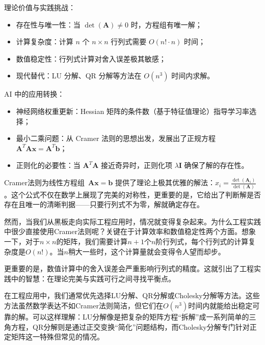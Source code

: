 理论价值与实践挑战：
\begin{itemize}
  \item 存在性与唯一性：当 $\det(\mathbf{A}) \neq 0$ 时，方程组有唯一解；
  \item 计算复杂度：计算 $n$ 个 $n \times n$ 行列式需要 $O(n! \cdot n)$ 时间；
  \item 数值稳定性：行列式计算对舍入误差极其敏感；
  \item 现代替代：LU 分解、QR 分解等方法在 $O(n^3)$ 时间内求解。
\end{itemize}

AI 中的应用转换：
\begin{itemize}
  \item 神经网络权重更新：Hessian 矩阵的条件数（基于特征值理论）指导学习率选择；
  \item 最小二乘问题：从 Cramer 法则的思想出发，发展出了正规方程 $\mathbf{A}^T\mathbf{A}\mathbf{x} = \mathbf{A}^T\mathbf{b}$；
  \item 正则化的必要性：当 $\mathbf{A}^T\mathbf{A}$ 接近奇异时，正则化项 $\lambda\mathbf{I}$ 确保了解的存在性。
\end{itemize}


Cramer法则为线性方程组~$\mathbf{A}\mathbf{x} = \mathbf{b}$ 提供了理论上极其优雅的解法：$x_i = \frac{\det(\mathbf{A}_i)}{\det(\mathbf{A})}$。这个公式不仅在数学上展现了完美的对称性，更重要的是，它给出了判断解是否存在且唯一的清晰判据——只要行列式不为零，解就确定存在。

然而，当我们从黑板走向实际工程应用时，情况就变得复杂起来。为什么工程实践中很少直接使用Cramer法则呢？关键在于计算效率和数值稳定性两个方面。想象一下，对于$n \times n$的矩阵，我们需要计算$n+1$个$n$阶行列式，每个行列式的计算复杂度是$O(n!)$。当$n$稍大一些时，这个计算量就会变得令人望而却步。

更重要的是，数值计算中的舍入误差会严重影响行列式的精度。这就引出了工程实践中的智慧：在理论完美与实践可行之间寻找平衡点。

在工程应用中，我们通常优先选择LU分解、QR分解或Cholesky分解等方法。这些方法虽然数学表达不如Cramer法则简洁，但它们在$O(n^3)$时间内就能给出稳定可靠的解。可以这样理解：LU分解像是把复杂的矩阵方程“拆解”成一系列简单的三角方程，QR分解则是通过正交变换“简化”问题结构，而Cholesky分解专门针对正定矩阵这一特殊但常见的情况。


